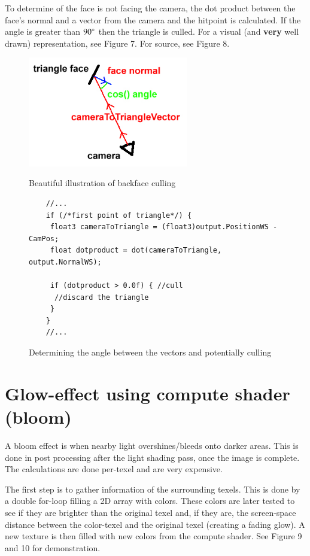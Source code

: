 \documentclass[a4paper,11pt]{article}
\begin{document}
To determine of the face is not facing the camera, the dot product between the face's normal and a vector from the camera and the hitpoint is calculated. If the angle is greater than $90\degree$ then the triangle is culled. For a visual (and \textbf{very} well drawn) representation, see Figure 7. For source, see Figure 8.

\begin{figure}[ht!]
	\begin{center}
		\label{fin}
		\includegraphics[width=7cm]{pic/backfaceCulling.jpg}
		\caption{Beautiful illustration of backface culling}
	\end{center}
\end{figure}

\begin{figure}[ht!]
\begin{lstlisting}
	//...
	if (/*first point of triangle*/) {
	 float3 cameraToTriangle = (float3)output.PositionWS - CamPos;
	 float dotproduct = dot(cameraToTriangle, output.NormalWS);
	 
	 if (dotproduct > 0.0f) { //cull
	  //discard the triangle
	 }
	}
	//...
\end{lstlisting}
\caption{Determining the angle between the vectors and potentially culling}
\end{figure}

\newpage
\section{Glow-effect using compute shader (bloom)}
A bloom effect is when nearby light overshines/bleeds onto darker areas. This is done in post processing after the light shading pass, once the image is complete. The calculations are done per-texel and are very expensive.

The first step is to gather information of the surrounding texels. This is done by a double for-loop filling a 2D array with colors. These colors are later tested to see if they are brighter than the original texel and, if they are, the screen-space distance between the color-texel and the original texel (creating a fading glow). A new texture is then filled with new colors from the compute shader. See Figure 9 and 10 for demonstration.
\end{document}
